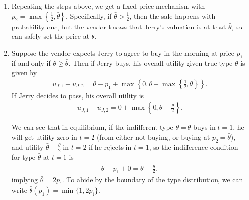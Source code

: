 \documentclass[a4paper]{article}
\begin{document}
\begin{enumerate}
	\item Repeating the steps above, we get a fixed-price mechanism with $p_2 = \max \left\{ \frac{1}{2}, \bar{\theta} \right\}$. Specifically, if $\bar{\theta} > \frac{1}{2}$, then the sale happens with probability one, but the vendor knows that Jerry's valuation is at least $\bar{\theta}$, so can safely set the price at $\bar{\theta}$.
	
	\item Suppose the vendor expects Jerry to agree to buy in the morning at price $p_1$ if and only if $\theta \geq \bar{\theta}$. Then if Jerry buys, his overall utility given true type $\theta$ is given by
	\begin{align*}
		u_{J,1} + u_{J,2} = \theta - p_1 + \max \left\{ 0, \theta - \max \left\{ \frac{1}{2}, \bar{\theta} \right\} \right\}.
	\end{align*}
	If Jerry decides to pass, his overall utility is
	\begin{align*}
		u_{J,1} + u_{J,2} = 0 + \max \left\{ 0, \theta - \frac{\bar{\theta}}{2} \right\}.
	\end{align*}
	
	We can see that in equilibrium, if the indifferent type $\theta = \bar{\theta}$ buys in $t=1$, he will get utility zero in $t=2$ (from either not buying, or buying at $p_2=\bar{\theta}$), and utility $\bar{\theta} - \frac{\bar{\theta}}{2}$ in $t=2$ if he rejects in $t=1$, so the indifference condition for type $\bar{\theta}$ at $t=1$ is
	\begin{align*}
		\bar{\theta} - p_1 + 0 = \bar{\theta} - \frac{\bar{\theta}}{2},
	\end{align*}
	implying $\bar{\theta} = 2p_1$. To abide by the boundary of the type distribution, we can write $\bar{\theta}(p_1) = \min \{1, 2p_1 \}$.
	
	

\end{enumerate}
\end{document}
